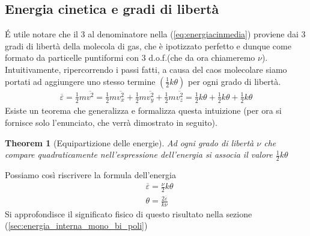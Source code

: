 \documentclass[10pt,a4paper]{article}
\newtheorem{theorem}{Theorem}
\begin{document}
\subsection{Energia cinetica e gradi di libertà}\label{sec:energiacinetica_d.o.f.}
\'{E} utile notare che il 3 al denominatore nella (\ref{eq:energiacinmedia}) proviene dai 3 gradi di libertà della molecola di gas, che è ipotizzato perfetto e dunque come formato da particelle puntiformi con 3 d.o.f.(che da ora chiameremo $\nu$). Intuitivamente, ripercorrendo i passi fatti, a causa del caos molecolare siamo portati ad aggiungere uno stesso termine \((\frac{1}{2}k\theta)\) per ogni grado di libertà. 
\begin{align*} 
	\overline{\varepsilon} = \frac{1}{2}m\overline{ v^2} = \frac{1}{2}m\overline{ v_x^2}+\frac{1}{2}m\overline{ v_y^2}+\frac{1}{2}m\overline{ v_z^2} = \frac{1}{2}k\theta+\frac{1}{2}k\theta+\frac{1}{2}k\theta
\end{align*}  
Esiste un teorema che generalizza e formalizza questa intuizione (per ora si fornisce solo l'enunciato, che verrà dimostrato in seguito).
\begin{theorem}[Equipartizione delle energie]
	Ad ogni grado di libertà $\nu$ che compare quadraticamente nell'espressione dell'energia si associa il valore \(\frac{1}{2}k\theta\)
\end{theorem}
Possiamo così riscrivere la formula dell'energia
\begin{align}\label{eq:energiacinetica_d.o.f.}
	&\overline{\varepsilon} = \frac{\nu}{2} k \theta\\
	&\theta = \frac{2 \overline{\varepsilon}}{k \nu}\nonumber
\end{align} 
Si approfondisce il significato fisico di questo risultato nella sezione (\ref{sec:energia_interna_mono_bi_poli})
\end{document}
